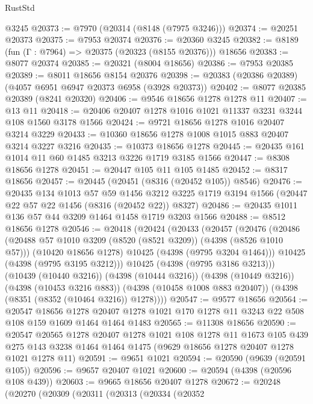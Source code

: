 \begin{lexlean}{RustStd}
\begin{coremodule}
    @3245
@20373 := @7970 (@20314 (@8148 (@7975 @3246)))
@20374 := @20251 @20373
@20375 := @7953 @20374
@20376 := @20360 @3245
@20382 := @8189 (fun (Γ : @7964) => @20375 (@20323 (@8155 @20376))) @18656
@20383 := @8077 @20374
@20385 := @20321 (@8004 @18656)
@20386 := @7953 @20385
@20389 := @8011 @18656 @8154 @20376
@20398 := @20383 (@20386 @20389) (@4057 @6951 @6947 @20373 @6958 (@3928 @20373))
@20402 := @8077 @20385 @20389 (@8241 @20320)
@20406 := @9546 @18656 @1278 @1278 @11
@20407 := @13 @11
@20418 := @20406 @20407 @1278 @1016 @1021 @11337 @3231 @3244 @108 @1560 @3178 @1566
@20424 := @9721 @18656 @1278 @1016 @20407 @3214 @3229
@20433 := @10360 @18656 @1278 @1008 @1015 @883 @20407 @3214 @3227 @3216
@20435 := @10373 @18656 @1278
@20445 := @20435 @161 @1014 @11 @60 @1485 @3213 @3226 @1719 @3185 @1566
@20447 := @8308 @18656 @1278
@20451 := @20447 @105 @11 @105 @1485
@20452 := @8317 @18656
@20457 := @20445 (@20451 (@8316 (@20452 @105)) @8546)
@20476 := @20435
    @134
    @1013
    @57
    @59
    @1456
    @3212
    @3225
    @1719
    @3194
    @1566
    (@20447 @22 @57 @22 @1456 (@8316 (@20452 @22)) @8327)
@20486 := @20435 @1011 @136 @57 @44 @3209 @1464 @1458 @1719 @3203 @1566
@20488 := @8512 @18656 @1278
@20546 := @20418
    (@20424
      (@20433
        (@20457
          (@20476
            (@20486
              (@20488 @57 @1010 @3209 (@8520 (@8521 @3209)) (@4398 (@8526 @1010 @57)))
              (@10420 @18656 @1278)
              @10425
              (@4398 (@9795 @3204 @1464)))
            @10425
            (@4398 (@9795 @3195 @3212)))
          @10425
          (@4398 (@9795 @3186 @3213)))
        (@10439 (@10440 @3216))
        (@4398 (@10444 @3216))
        (@4398 (@10449 @3216))
        (@4398 (@10453 @3216 @883))
        (@4398 (@10458 @1008 @883 @20407))
        (@4398 (@8351 (@8352 (@10464 @3216)) @1278))))
@20547 := @9577 @18656
@20564 := @20547
    @18656
    @1278
    @20407
    @1278
    @1021
    @170
    @1278
    @11
    @3243
    @22
    @508
    @108
    @159
    @1609
    @1464
    @1464
    @1483
@20565 := @11308 @18656
@20590 := @20547
    @20565
    @1278
    @20407
    @1278
    @1021
    @108
    @1278
    @11
    @1673
    @105
    @439
    @275
    @143
    @3238
    @1464
    @1464
    @1475
    (@9629 @18656 @1278 @20407 @1278 @1021 @1278 @11)
@20591 := @9651 @1021
@20594 := @20590 (@9639 (@20591 @105))
@20596 := @9657 @20407 @1021
@20600 := @20594 (@4398 (@20596 @108 @439))
@20603 := @9665 @18656 @20407 @1278
@20672 := @20248
    (@20270
      (@20309
        (@20311
          (@20313
            (@20334
              (@20352

\end{coremodule}
\end{lexlean}
